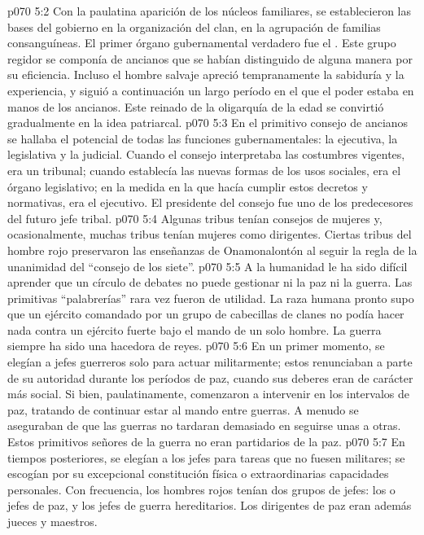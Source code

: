 \vs p070 5:2 Con la paulatina aparición de los núcleos familiares, se establecieron las bases del gobierno en la organización del clan, en la agrupación de familias consanguíneas. El primer órgano gubernamental verdadero fue el . Este grupo regidor se componía de ancianos que se habían distinguido de alguna manera por su eficiencia. Incluso el hombre salvaje apreció tempranamente la sabiduría y la experiencia, y siguió a continuación un largo período en el que el poder estaba en manos de los ancianos. Este reinado de la oligarquía de la edad se convirtió gradualmente en la idea patriarcal.
\vs p070 5:3 En el primitivo consejo de ancianos se hallaba el potencial de todas las funciones gubernamentales: la ejecutiva, la legislativa y la judicial. Cuando el consejo interpretaba las costumbres vigentes, era un tribunal; cuando establecía las nuevas formas de los usos sociales, era el órgano legislativo; en la medida en la que hacía cumplir estos decretos y normativas, era el ejecutivo. El presidente del consejo fue uno de los predecesores del futuro jefe tribal.
\vs p070 5:4 Algunas tribus tenían consejos de mujeres y, ocasionalmente, muchas tribus tenían mujeres como dirigentes. Ciertas tribus del hombre rojo preservaron las enseñanzas de Onamonalontón al seguir la regla de la unanimidad del “consejo de los siete”.
\vs p070 5:5 \pc A la humanidad le ha sido difícil aprender que un círculo de debates no puede gestionar ni la paz ni la guerra. Las primitivas “palabrerías” rara vez fueron de utilidad. La raza humana pronto supo que un ejército comandado por un grupo de cabecillas de clanes no podía hacer nada contra un ejército fuerte bajo el mando de un solo hombre. La guerra siempre ha sido una hacedora de reyes.
\vs p070 5:6 \pc En un primer momento, se elegían a jefes guerreros solo para actuar militarmente; estos renunciaban a parte de su autoridad durante los períodos de paz, cuando sus deberes eran de carácter más social. Si bien, paulatinamente, comenzaron a intervenir en los intervalos de paz, tratando de continuar estar al mando entre guerras. A menudo se aseguraban de que las guerras no tardaran demasiado en seguirse unas a otras. Estos primitivos señores de la guerra no eran partidarios de la paz.
\vs p070 5:7 En tiempos posteriores, se elegían a los jefes para tareas que no fuesen militares; se escogían por su excepcional constitución física o extraordinarias capacidades personales. Con frecuencia, los hombres rojos tenían dos grupos de jefes: los  o jefes de paz, y los jefes de guerra hereditarios. Los dirigentes de paz eran además jueces y maestros.
